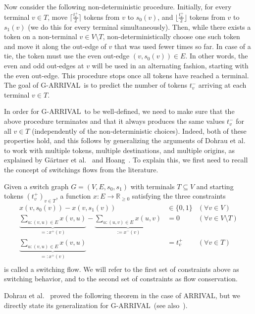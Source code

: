 \documentclass[a4paper,UKenglish,cleveref, autoref, thm-restate]{lipics-v2021}
\newcommand{\R}{\mathbb{R}}
\newcommand{\problem}[1]{\textrm{#1}}
\newcommand{\arrival}{\problem{ARRIVAL}}
\newcommand{\garrival}{\problem{G-ARRIVAL}}
\begin{document}
Now consider the following non-deterministic procedure. Initially, for every terminal $v \in T$, move $\lceil \frac{t^+_v}{2} \rceil$ tokens from $v$ to $s_0(v)$, and $\lfloor \frac{t^+_v}{2} \rfloor$ tokens from $v$ to $s_1(v)$ (we do this for every terminal simultaneously). Then, while there exists a token on a non-terminal $v \in V \setminus T$, non-deterministically choose one such token and move it along the out-edge of $v$ that was used fewer times so far. In case of a tie, the token must use the even out-edge $(v, s_0(v)) \in E$. In other words, the even and odd out-edges at $v$ will be used in an alternating fashion, starting with the even out-edge. This procedure stops once all tokens have reached a terminal. The goal of \garrival\ is to predict the number of tokens $t^-_v$ arriving at each terminal $v \in T$. 

In order for \garrival\ to be well-defined, we need to make sure that the above procedure terminates and that it always produces the same values $t^-_v$ for all $v \in T$ (independently of the non-deterministic choices). Indeed, both of these properties hold, and this follows by generalizing the arguments of Dohrau et al.\@~\cite{dohrauARRIVALZeroPlayerGraph2017} to work with multiple tokens, multiple destinations, and multiple origins, as explained by Gärtner et al.\@~\cite{gartnerSubexponentialAlgorithmARRIVAL2021} and Hoang~\cite{hoangTwoCombinatorialReconfiguration2022}. To explain this, we first need to recall the concept of switchings flows from the literature. 

Given a switch graph $G = (V, E, s_0, s_1)$ with terminals $T \subseteq V$ and starting tokens $(t^+_v)_{v \in T}$, a function $x : E \rightarrow \R_{\geq 0}$ satisfying the three constraints
\begin{align*}
    x(v, s_0(v)) - x(v, s_1(v)) &\in \{0, 1\} &(\forall v \in V)\\
    \underbrace{\sum_{u : (v, u) \in E} x(v, u)}_{ =: x^+(v) } - \underbrace{\sum_{u : (u, v) \in E} x(u, v)}_{:= x^-(v)} &= 0 &(\forall v \in V \setminus T) \\
    \underbrace{\sum_{u : (v, u) \in E} x(v, u)}_{ =: x^+(v) } &= t^+_v &(\forall v \in T) \\
\end{align*}
is called a switching flow. We will refer to the first set of constraints above as switching behavior, and to the second set of constraints as flow conservation. 

Dohrau et al.\@~\cite{dohrauARRIVALZeroPlayerGraph2017} proved the following theorem in the case of \arrival, but we directly state its generalization for \garrival\ (see also~\cite{gartnerSubexponentialAlgorithmARRIVAL2021, hoangTwoCombinatorialReconfiguration2022}).
\end{document}
